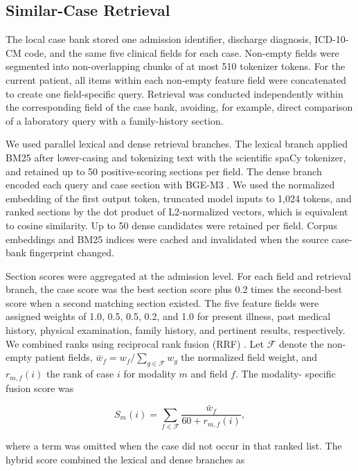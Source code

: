 \documentclass[10pt,letterpaper]{article}
\begin{document}
\subsection{Similar-Case Retrieval}

The local case bank stored one admission identifier, discharge diagnosis,
ICD-10-CM code, and the same five clinical fields for each case. Non-empty fields
were segmented into non-overlapping chunks of at most 510 tokenizer tokens. For
the current patient, all items within each non-empty feature field were
concatenated to create one field-specific query. Retrieval was conducted
independently within the corresponding field of the case bank, avoiding, for
example, direct comparison of a laboratory query with a family-history section.

We used parallel lexical and dense retrieval branches. The lexical branch applied
BM25 \cite{robertson1995okapi} after lower-casing and tokenizing text with the
scientific spaCy tokenizer, and retained up to 50 positive-scoring sections per
field. The dense branch encoded each query and case section with BGE-M3
\cite{chen2024bgem3}. We used the normalized embedding of the first output token,
truncated model inputs to 1,024 tokens, and ranked sections by the dot product of
L2-normalized vectors, which is equivalent to cosine similarity. Up to 50 dense
candidates were retained per field. Corpus embeddings and BM25 indices were
cached and invalidated when the source case-bank fingerprint changed.

Section scores were aggregated at the admission level. For each field and
retrieval branch, the case score was the best section score plus 0.2 times the
second-best score when a second matching section existed. The five feature fields
were assigned weights of 1.0, 0.5, 0.5, 0.2, and 1.0 for present illness, past
medical history, physical examination, family history, and pertinent results,
respectively. We combined ranks using reciprocal rank fusion (RRF)
\cite{cormack2009rrf}. Let $\mathcal{F}$ denote the non-empty patient fields,
$\bar{w}_f=w_f/\sum_{g\in\mathcal{F}}w_g$ the normalized field weight, and
$r_{m,f}(i)$ the rank of case $i$ for modality $m$ and field $f$. The modality-
specific fusion score was

\begin{equation}
  S_m(i)=\sum_{f\in\mathcal{F}}
  \frac{\bar{w}_f}{60+r_{m,f}(i)},
\end{equation}

where a term was omitted when the case did not occur in that ranked list. The
hybrid score combined the lexical and dense branches as
\end{document}
